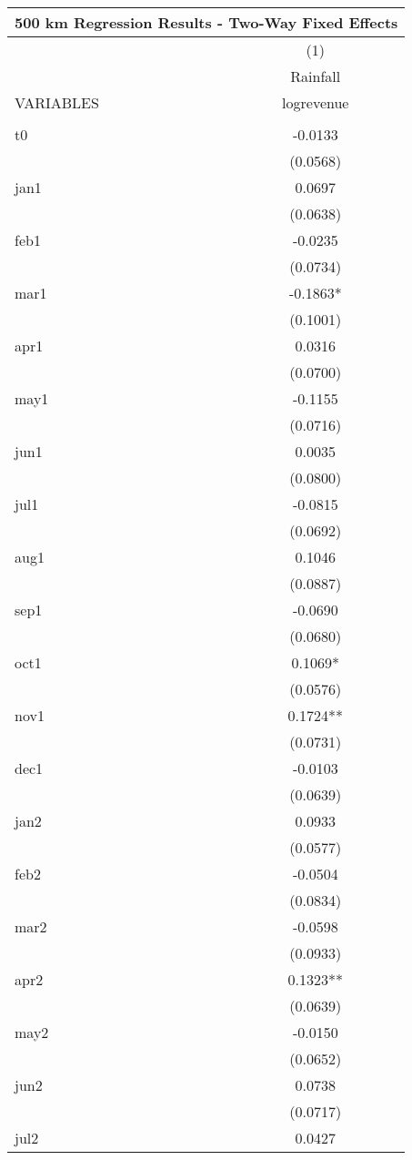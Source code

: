 \documentclass[]{article}
\begin{document}
\begin{tabular}{lc}
\multicolumn{2}{c}{\huge 500 km Regression Results - Two-Way Fixed Effects} \\ \hline
 & (1) \\
 & \Large Rainfall \\
VARIABLES & logrevenue \\ \hline
 &  \\
t0 & -0.0133 \\
 & (0.0568) \\
jan1 & 0.0697 \\
 & (0.0638) \\
feb1 & -0.0235 \\
 & (0.0734) \\
mar1 & -0.1863* \\
 & (0.1001) \\
apr1 & 0.0316 \\
 & (0.0700) \\
may1 & -0.1155 \\
 & (0.0716) \\
jun1 & 0.0035 \\
 & (0.0800) \\
jul1 & -0.0815 \\
 & (0.0692) \\
aug1 & 0.1046 \\
 & (0.0887) \\
sep1 & -0.0690 \\
 & (0.0680) \\
oct1 & 0.1069* \\
 & (0.0576) \\
nov1 & 0.1724** \\
 & (0.0731) \\
dec1 & -0.0103 \\
 & (0.0639) \\
jan2 & 0.0933 \\
 & (0.0577) \\
feb2 & -0.0504 \\
 & (0.0834) \\
mar2 & -0.0598 \\
 & (0.0933) \\
apr2 & 0.1323** \\
 & (0.0639) \\
may2 & -0.0150 \\
 & (0.0652) \\
jun2 & 0.0738 \\
 & (0.0717) \\
jul2 & 0.0427 \\

\end{tabular}
\end{document}
